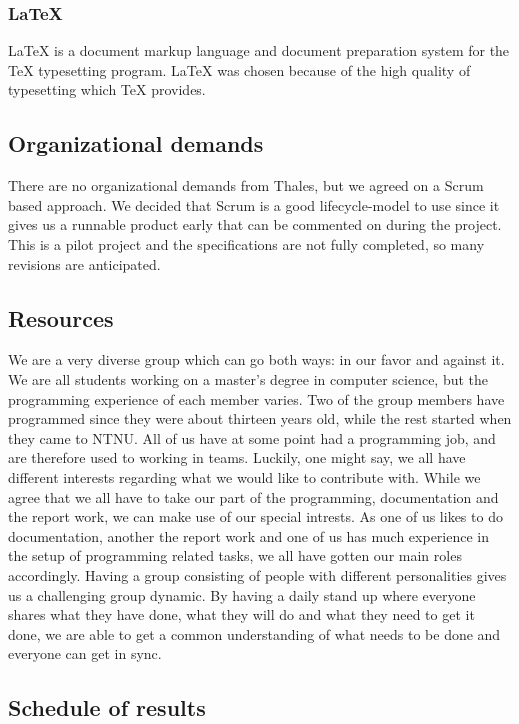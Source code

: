 \subsubsection{LaTeX}
LaTeX is a document markup language and document preparation system for the TeX typesetting program. LaTeX was chosen because of the high quality of typesetting which TeX provides.

\subsection{Organizational demands}
There are no organizational demands from Thales, but we agreed on a Scrum based approach. We decided that Scrum is a good lifecycle-model to use since it gives us a runnable product early that can be commented on during the project. This is a pilot project and the specifications are not fully completed, so many revisions are anticipated.

\subsection{Resources}
We are a very diverse group which can go both ways: in our favor and against it. We are all students working on a master's degree in computer science, but the programming experience of each member varies. Two of the group members have
programmed since they were about thirteen years old, while the rest started when they came to NTNU. All of us have at some point had a programming job, and are therefore used to working in teams.
\newline
\newline
Luckily, one might say, we all have different interests regarding what we would like to contribute with. While we agree that we all have to take our part of the programming, documentation and the report work, we can make use of our special intrests. As one of us likes to do documentation, another the report work and one of us has much experience in the setup of programming related tasks, we all have gotten our main roles accordingly.
\newline
\newline
Having a group consisting of people with different personalities gives us a challenging group dynamic. By having a daily stand up where everyone shares what they have done, what they will do and what they need to get it done, we are able to get a common understanding of what needs to be done and everyone can get in sync.

\subsection{Schedule of results}

